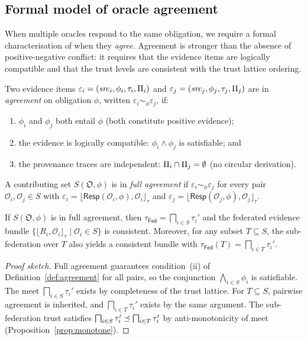 \documentclass[11pt]{article}
\newcommand{\Oracle}{\mathcal{O}}            %
\newcommand{\OrcSet}{\mathfrak{O}}           %
\newcommand{\Orcl}[1]{\Oracle_{#1}}         %
\newcommand{\Fed}{\mathsf{Fed}}             %
\newcommand{\Ceil}[1]{\lfloor #1 \rfloor_{\tau}}   %
\newcommand{\Resp}{\mathsf{Resp}}           %
\begin{document}
\subsection{Formal model of oracle agreement}\label{sec:agreement}

When multiple oracles respond to the same obligation, we require a formal
characterisation of when they \emph{agree}.  Agreement is stronger than
the absence of positive-negative conflict: it requires that the evidence
items are logically compatible and that the trust levels are consistent
with the trust lattice ordering.

\begin{definition}\label{def:agreement}
  Two evidence items $\varepsilon_i = (\mathit{src}_i, \phi_i, \tau_i,
  \Pi_i)$
  and $\varepsilon_j = (\mathit{src}_j, \phi_j, \tau_j, \Pi_j)$ are in
  \emph{agreement} on obligation $\phi$, written
  $\varepsilon_i \sim_\phi \varepsilon_j$, if:
  \begin{enumerate}[label=(\roman*),nosep]
    \item $\phi_i$ and $\phi_j$ both entail $\phi$ (both constitute
          positive evidence);
    \item the evidence is logically compatible: $\phi_i \wedge \phi_j$ is
          satisfiable; and
    \item the provenance traces are independent:
          $\Pi_i \cap \Pi_j = \emptyset$ (no circular derivation).
  \end{enumerate}
\end{definition}

\begin{definition}\label{def:full-agreement}
  A contributing set $S(\OrcSet, \phi)$ is in \emph{full agreement} if
  $\varepsilon_i \sim_\phi \varepsilon_j$ for every pair
  $\Orcl{i}, \Orcl{j} \in S$ with
  $\varepsilon_i = \Ceil{\Resp(\Orcl{i},\phi), \Orcl{i}}$ and
  $\varepsilon_j = \Ceil{\Resp(\Orcl{j},\phi), \Orcl{j}}$.
\end{definition}

\begin{theorem}\label{thm:agreement-meet}
  If $S(\OrcSet, \phi)$ is in full agreement, then
  $\tau_{\Fed} = \bigsqcap_{i \in S} \tau_i'$ and the federated
  evidence bundle $\bigl\{\Ceil{R_i, \Orcl{i}} \mid \Orcl{i} \in S\bigr\}$
  is consistent.  Moreover, for any subset $T \subseteq S$, the
  sub-federation over $T$ also yields a consistent bundle with
  $\tau_{\Fed}(T) = \bigsqcap_{i \in T} \tau_i'$.
\end{theorem}
\begin{proof}[Proof sketch]
  Full agreement guarantees condition~(ii) of
  Definition~\ref{def:agreement} for all pairs, so the conjunction
  $\bigwedge_{i \in S} \phi_i$ is satisfiable.  The meet
  $\bigsqcap_{i \in S} \tau_i'$ exists by completeness of the trust
  lattice.  For $T \subseteq S$, pairwise agreement is inherited, and
  $\bigsqcap_{i \in T} \tau_i'$ exists by the same argument.  The
  sub-federation trust satisfies
  $\bigsqcap_{i \in S} \tau_i' \preceq \bigsqcap_{i \in T} \tau_i'$
  by anti-monotonicity of meet (Proposition~\ref{prop:monotone}).
\end{proof}
\end{document}

